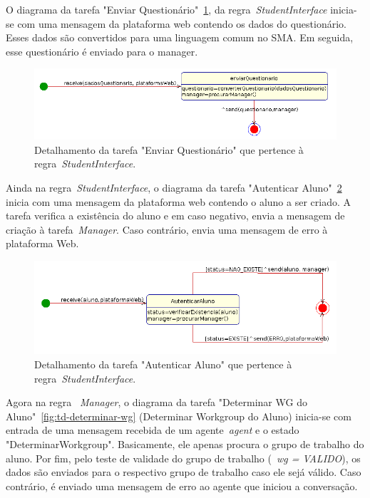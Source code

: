 O diagrama da tarefa "Enviar Questionário"~\ref{fig:td-enviar-quest}, da regra~\emph{StudentInterface} inicia-se com uma mensagem da plataforma web contendo os dados do questionário. Esses dados são convertidos para uma linguagem comum no SMA. Em seguida, esse questionário é enviado para o manager.

\begin{figure}
	\centering
	\includegraphics[scale=0.48]{images/td-enviar-quest.png}
	\caption{Detalhamento da tarefa "Enviar Questionário" que pertence à regra~\emph{StudentInterface}.}
	\label{fig:td-enviar-quest}
\end{figure}

Ainda na regra~\emph{StudentInterface}, o diagrama da tarefa "Autenticar Aluno"~\ref{fig:td-autenticar-aluno} inicia com uma mensagem da plataforma web contendo o aluno a ser criado. A tarefa verifica a existência do aluno e em caso negativo, envia a mensagem de criação à tarefa~\emph{Manager}. Caso contrário, envia uma mensagem de erro à plataforma Web.

\begin{figure}
	\centering
	\includegraphics[scale=0.48]{images/td-autenticar-aluno.png}
	\caption{Detalhamento da tarefa "Autenticar Aluno" que pertence à regra~\emph{StudentInterface}.}
	\label{fig:td-autenticar-aluno}
\end{figure}

Agora na regra ~\emph{Manager}, o diagrama da tarefa "Determinar WG do Aluno"~\ref{fig:td-determinar-wg} (Determinar Workgroup do Aluno) inicia-se com entrada de uma mensagem recebida de um agente~\emph{agent} e o estado "DeterminarWorkgroup". Basicamente, ele apenas procura o grupo de trabalho do aluno. Por fim, pelo teste de validade do grupo de trabalho (~\emph{wg = VALIDO}), os dados são enviados para o respectivo grupo de trabalho caso ele sejá válido. Caso contrário, é enviado uma mensagem de erro ao agente que iniciou a conversação.

